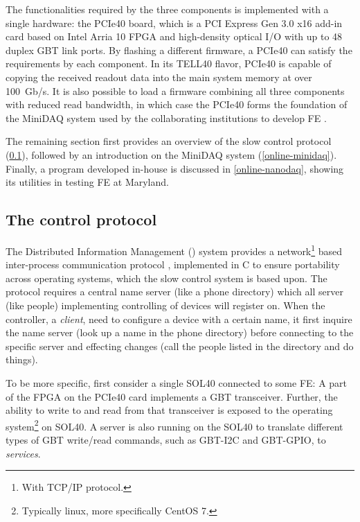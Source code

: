 The functionalities required by the three components is implemented with a
single hardware:
the PCIe40 board,
which is a PCI Express Gen 3.0 x16 add-in card based on Intel Arria 10 FPGA and
high-density optical I/O with up to 48 duplex GBT link ports.
By flashing a different firmware,
a PCIe40 can satisfy the requirements by each component.
In its TELL40 flavor, PCIe40 is capable of copying the received readout data
into the main system memory at over 100~Gb/s.
It is also possible to load a firmware combining all three components with
reduced read bandwidth, in which case the PCIe40 forms the foundation of the
MiniDAQ system used by the collaborating institutions to develop FE
\cite{GranadoCardoso:2702137}.

The remaining section first provides an overview of
the slow control protocol (\cref{online-dim}),
followed by an introduction on the MiniDAQ system
(\cref{online-minidaq}).
Finally, a program developed in-house is discussed in \cref{online-nanodaq},
showing its utilities in testing FE at Maryland.


\subsection{The \dim control protocol}
\label{online-dim}

The Distributed Information Management (\dim) system provides
a network\footnote{
    With TCP/IP protocol.
} based inter-process communication protocol \cite{Gaspar:559279},
implemented in C to ensure portability across operating systems,
which the slow control system is based upon.
The \dim protocol requires a central name server (like a phone directory)
which all \dim server (like people) implementing controlling of devices will
register on.
When the controller, a \dim \emph{client}, need to configure a device with a
certain name,
it first inquire the name server (look up a name in the phone
directory) before connecting to the specific \dim server and effecting changes
(call the people listed in the directory and do things).

To be more specific,
first consider a single SOL40 connected to some FE:
A part of the FPGA on the PCIe40 card implements a GBT transceiver.
Further, the ability to write to and read from that transceiver is exposed
to the operating system\footnote{
    Typically linux, more specifically CentOS 7.
} on SOL40.
A \dim server is also running on the SOL40 to translate different types of GBT
write/read commands,
such as GBT-I2C and GBT-GPIO,
to \dim \emph{services}.

